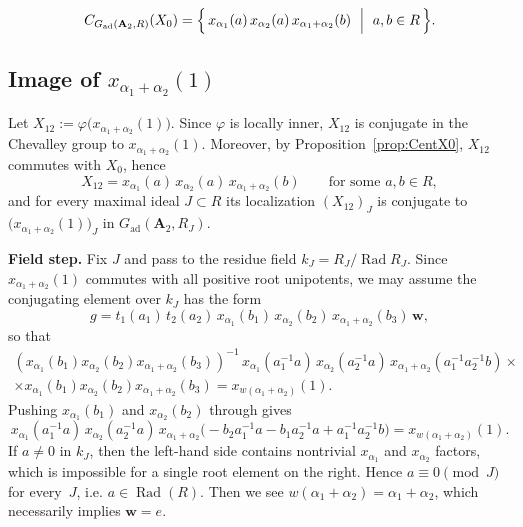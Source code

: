 \documentclass[]{jgcc}
\DeclareMathOperator{\Rad}{Rad}
\numberwithin{equation}{section}
\begin{document}
\begin{prop}\label{prop:CentX0}
\[
C_{G_{\mathrm{ad}}(\mathbf A_2,R)}(X_0)
=\Bigl\{\,x_{\alpha_1}(a)\,x_{\alpha_2}(a)\,x_{\alpha_1+\alpha_2}(b)\ \Bigm|\ a,b\in R\,\Bigr\}.
\]
\end{prop}

\subsection{\texorpdfstring{Image of $x_{\alpha_1+\alpha_2}(1)$}{Image of xalpha1+alpha2(1)}}\label{subsec:image-a1+a2}

Let $X_{12}:=\varphi\bigl(x_{\alpha_1+\alpha_2}(1)\bigr)$.
Since $\varphi$ is locally inner, $X_{12}$ is conjugate in the Chevalley group to $x_{\alpha_1+\alpha_2}(1)$.
Moreover, by Proposition~\ref{prop:CentX0}, $X_{12}$ commutes with $X_0$, hence
\[
X_{12}=x_{\alpha_1}(a)\,x_{\alpha_2}(a)\,x_{\alpha_1+\alpha_2}(b)\qquad\text{for some }a,b\in R,
\]
and for every maximal ideal $J\subset R$ its localization $(X_{12})_J$ is conjugate to $\bigl(x_{\alpha_1+\alpha_2}(1)\bigr)_J$ in $G_{\mathrm{ad}}(\mathbf A_2,R_J)$.

\medskip
\noindent\textbf{Field step.}
Fix $J$ and pass to the residue field $k_J=R_J/\Rad R_J$.
Since $x_{\alpha_1+\alpha_2}(1)$ commutes with all positive root unipotents, we may assume the conjugating element over $k_J$ has the form
\[
g=t_1(a_1)\,t_2(a_2)\,x_{\alpha_1}(b_1)\,x_{\alpha_2}(b_2)\,x_{\alpha_1+\alpha_2}(b_3)\,\mathbf w,
\]
so that
\begin{multline*}
(x_{\alpha_1}(b_1)x_{\alpha_2}(b_2)x_{\alpha_1+\alpha_2}(b_3))^{-1}\,
x_{\alpha_1}(a_1^{-1}a)\,x_{\alpha_2}(a_2^{-1}a)\,x_{\alpha_1+\alpha_2}(a_1^{-1}a_2^{-1}b)\times \\
\times x_{\alpha_1}(b_1)x_{\alpha_2}(b_2)x_{\alpha_1+\alpha_2}(b_3)
= x_{w(\alpha_1+\alpha_2)}(1).
\end{multline*}
Pushing $x_{\alpha_1}(b_1)$ and $x_{\alpha_2}(b_2)$ through gives
\[
x_{\alpha_1}(a_1^{-1}a)\,x_{\alpha_2}(a_2^{-1}a)\,
x_{\alpha_1+\alpha_2}\bigl(-b_2a_1^{-1}a-b_1a_2^{-1}a+a_1^{-1}a_2^{-1}b\bigr)
= x_{w(\alpha_1+\alpha_2)}(1).
\]
If $a\neq 0$ in $k_J$, then the left-hand side contains nontrivial $x_{\alpha_1}$ and $x_{\alpha_2}$ factors, which is impossible for a single root element on the right.
Hence $a\equiv 0\pmod{J}$ for every~$J$, i.e. $a\in \Rad(R)$.
Then we see $w(\alpha_1+\alpha_2)=\alpha_1+\alpha_2$, which necessarily implies $\mathbf w=e$.
\end{document}
